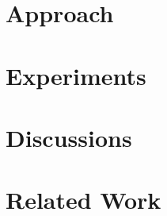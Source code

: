 \section{Approach}


\section{Experiments}


 \section{Discussions}
 

\section{Related Work}








